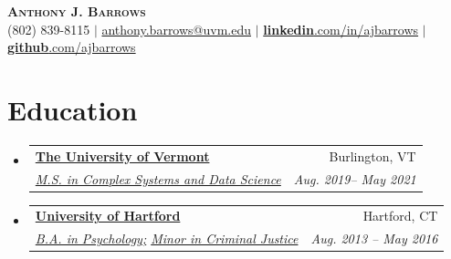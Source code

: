 \documentclass[letterpaper,11pt]{article}
\makeatletter
\newcommand{\resumeSubheading}[4]{
  \vspace{-2pt}\item
    \begin{tabular*}{0.97\textwidth}[t]{l@{\extracolsep{\fill}}r}
      \textbf{#1} & #2 \\
      \textit{\small#3} & \textit{\small #4} \\
    \end{tabular*}\vspace{-7pt}
}
\newcommand{\resumeSubHeadingListStart}{\begin{itemize}[leftmargin=0.15in, label={}]}
\newcommand{\resumeSubHeadingListEnd}{\end{itemize}}
\makeatother
\begin{document}

\begin{center}
    \textbf{\Huge \scshape Anthony J. Barrows} \\ \vspace{3pt}
    \small (802) 839-8115 $|$ \href{mailto:ajbarrow@uvm.edu}{anthony.barrows@uvm.edu} $|$ 
    \href{https://linkedin.com/in/ajbarrows}{\textbf{linkedin}.com/in/ajbarrows} $|$ \href{https://github.com/ajbarrows}{\textbf{github}.com/ajbarrows}
\end{center}


\section{Education}
  \resumeSubHeadingListStart
    \resumeSubheading
      {\href{https://uvm.edu}{\textbf{The University of Vermont}}}{Burlington, VT}
      {\href{https://vermontcomplexsystems.org/}{M.S. in Complex Systems and Data Science}}
      {Aug. 2019-- May 2021}
    \resumeSubheading
      {\href{https://www.hartford.edu/}{\textbf{University of Hartford}}}{Hartford, CT}
      {\href{https://www.hartford.edu/academics/schools-colleges/arts-sciences/academics/departments-and-centers/psychology/default.aspx}{B.A. in Psychology;} \href{https://www.hartford.edu/academics/schools-colleges/arts-sciences/academics/departments-and-centers/sociology-and-criminal-justice/default.aspx}{Minor in Criminal Justice}}
      {Aug. 2013 -- May 2016}
  \resumeSubHeadingListEnd


\end{document}
